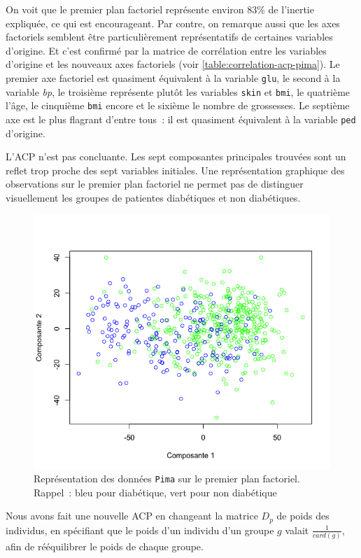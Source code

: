 \documentclass[a4paper,11pt]{report}
\begin{document}
On voit que le premier plan factoriel représente environ 83\% de l'inertie expliquée, ce qui est encourageant.
Par contre, on remarque aussi que les axes factoriels semblent être particulièrement représentatifs de certaines variables d'origine. Et c'est confirmé par la matrice de corrélation entre les variables d'origine et les nouveaux axes factoriels (voir \autoref{table:correlation-acp-pima}). Le premier axe factoriel est quasiment équivalent à la variable \texttt{glu}, le second à la variable \textit{bp}, le troisième représente plutôt les variables \texttt{skin} et \texttt{bmi}, le quatrième l'âge, le cinquième \texttt{bmi} encore et le sixième le nombre de grossesses. Le septième axe est le plus flagrant d'entre tous~: il est quasiment équivalent à la variable \texttt{ped} d'origine.

L'ACP n'est pas concluante. Les sept composantes principales trouvées sont un reflet trop proche des sept variables initiales. Une représentation graphique des observations sur le premier plan factoriel ne permet pas de distinguer visuellement les groupes de patientes diabétiques et non diabétiques.


\begin{figure}[H]
	\centering
	\captionsetup{justification=centering, margin=2cm}
	\includegraphics[width=.7\linewidth]{img/2-4-Pima-ACP-premier-plan-factoriel}
	\caption{\scriptsize Représentation des données \texttt{Pima} sur le premier plan factoriel.\\ \tiny Rappel~: bleu pour diabétique, vert pour non diabétique}
	\label{fig:2-4-Pima-ACP-premier-plan-factoriel}
\end{figure}


Nous avons fait une nouvelle ACP en changeant la matrice $D_p$ de poids des individus, en spécifiant que le poids d'un individu d'un groupe $g$ valait $\frac{1}{card(g)}$, afin de rééquilibrer le poids de chaque groupe.
\end{document}

